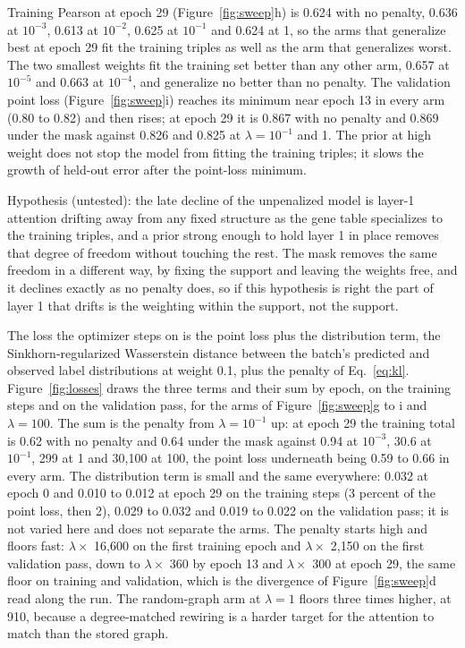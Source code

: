 Training Pearson at epoch 29 (Figure~\ref{fig:sweep}h) is 0.624 with no penalty, 0.636
at $10^{-3}$, 0.613 at $10^{-2}$, 0.625 at $10^{-1}$ and 0.624 at 1, so the arms that
generalize best at epoch 29 fit the training triples as well as the arm that generalizes
worst. The two smallest weights fit the training set better than any other arm, 0.657
at $10^{-5}$ and 0.663 at $10^{-4}$, and generalize no better than no penalty. The
validation point loss (Figure~\ref{fig:sweep}i) reaches its minimum near epoch 13 in
every arm (0.80 to 0.82) and then rises; at epoch 29 it is 0.867 with no penalty and
0.869 under the mask against 0.826 and 0.825 at $\lambda = 10^{-1}$ and 1. The prior at
high weight does not stop the model from fitting the training triples; it slows the
growth of held-out error after the point-loss minimum.

Hypothesis (untested): the late decline of the unpenalized model is layer-1 attention
drifting away from any fixed structure as the gene table specializes to the training
triples, and a prior strong enough to hold layer 1 in place removes that degree of
freedom without touching the rest. The mask removes the same freedom in a different
way, by fixing the support and leaving the weights free, and it declines exactly as no
penalty does, so if this hypothesis is right the part of layer 1 that drifts is the
weighting within the support, not the support.

The loss the optimizer steps on is the point loss plus the distribution term, the
Sinkhorn-regularized Wasserstein distance between the batch's predicted and observed
label distributions at weight 0.1, plus the penalty of Eq.~\ref{eq:kl}. Figure~\ref{fig:losses}
draws the three terms and their sum by epoch, on the training steps and on the
validation pass, for the arms of Figure~\ref{fig:sweep}g to i and $\lambda = 100$. The
sum is the penalty from $\lambda = 10^{-1}$ up: at epoch 29 the training total is 0.62
with no penalty and 0.64 under the mask against 0.94 at $10^{-3}$, 30.6 at $10^{-1}$,
299 at 1 and 30{,}100 at 100, the point loss underneath being 0.59 to 0.66 in every arm.
The distribution term is small and the same everywhere: 0.032 at epoch 0 and 0.010 to
0.012 at epoch 29 on the training steps (3 percent of the point loss, then 2), 0.029 to
0.032 and 0.019 to 0.022 on the validation pass; it is not varied here and does not
separate the arms. The penalty starts high and floors fast: $\lambda \times$ 16{,}600
on the first training epoch and $\lambda \times$ 2{,}150 on the first validation pass,
down to $\lambda \times$ 360 by epoch 13 and $\lambda \times$ 300 at epoch 29, the same
floor on training and validation, which is the divergence of
Figure~\ref{fig:sweep}d read along the run. The random-graph arm at $\lambda = 1$ floors
three times higher, at 910, because a degree-matched rewiring is a harder target for the
attention to match than the stored graph.

